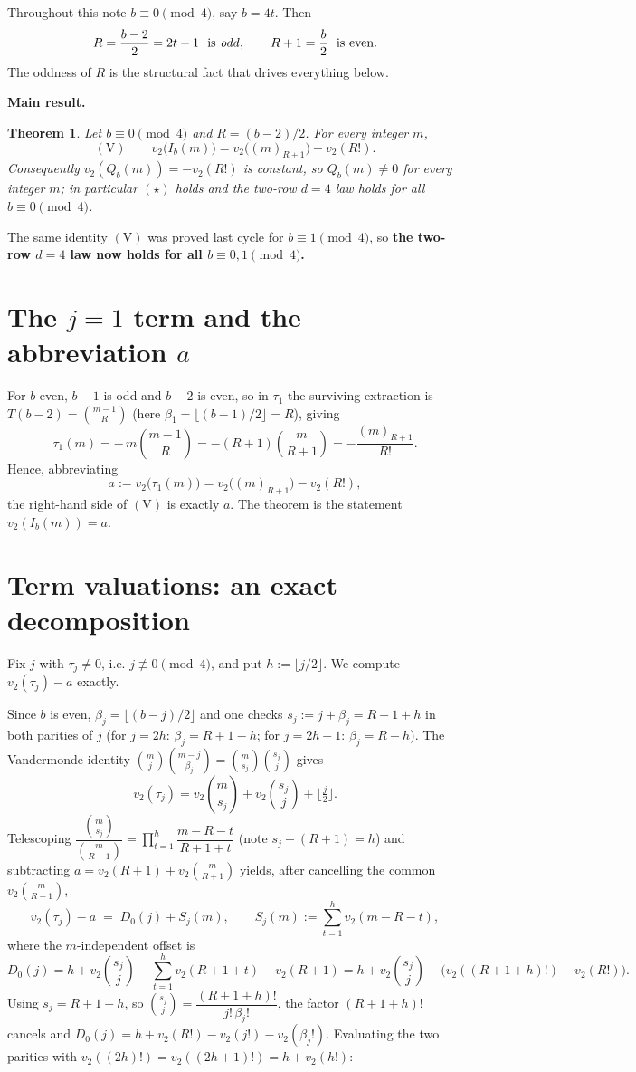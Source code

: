 \documentclass[11pt]{article}
\newtheorem{theorem}{Theorem}
\theoremstyle{definition}
\newcommand{\vtwo}{v_2}
\newcommand{\ff}[2]{(#1)_{#2}}
\begin{document}
Throughout this note $b\equiv 0\pmod 4$, say $b=4t$. Then
\[
   R=\frac{b-2}2=2t-1\ \text{ is \emph{odd}},\qquad R+1=\frac b2\ \text{ is even}.
\]
The oddness of $R$ is the structural fact that drives everything below.

\medskip
\noindent\textbf{Main result.}
\begin{theorem}\label{thm:main}
Let $b\equiv 0\pmod 4$ and $R=(b-2)/2$. For every integer $m$,
\[
   (\mathrm V)\qquad \vtwo\bigl(I_b(m)\bigr)=\vtwo\bigl(\ff{m}{R+1}\bigr)-\vtwo(R!).
\]
Consequently $\vtwo(Q_b(m))=-\vtwo(R!)$ is constant, so $Q_b(m)\neq 0$ for every
integer $m$; in particular $(\star)$ holds and the two-row $d=4$ law holds for all
$b\equiv 0\pmod 4$.
\end{theorem}

The same identity $(\mathrm V)$ was proved last cycle for $b\equiv 1\pmod 4$, so
\textbf{the two-row $d=4$ law now holds for all $b\equiv 0,1\pmod 4$.}

\section{The $j=1$ term and the abbreviation $a$}

For $b$ even, $b-1$ is odd and $b-2$ is even, so in $\tau_1$ the surviving
extraction is $T(b-2)=\binom{m-1}{R}$ (here $\beta_1=\lfloor(b-1)/2\rfloor=R$),
giving
\[
   \tau_1(m)=-\,m\binom{m-1}{R}=-(R+1)\binom{m}{R+1}=-\frac{\ff{m}{R+1}}{R!}.
\]
Hence, abbreviating
\[
   a:=\vtwo\bigl(\tau_1(m)\bigr)=\vtwo\bigl(\ff{m}{R+1}\bigr)-\vtwo(R!),
\]
the right-hand side of $(\mathrm V)$ is exactly $a$. The theorem is the statement
$\vtwo(I_b(m))=a$.

\section{Term valuations: an exact decomposition}\label{sec:decomp}

Fix $j$ with $\tau_j\neq 0$, i.e. $j\not\equiv 0\pmod 4$, and put
$h:=\lfloor j/2\rfloor$. We compute $\vtwo(\tau_j)-a$ exactly.

Since $b$ is even, $\beta_j=\lfloor (b-j)/2\rfloor$ and one checks
$s_j:=j+\beta_j=R+1+h$ in both parities of $j$ (for $j=2h$: $\beta_j=R+1-h$; for
$j=2h+1$: $\beta_j=R-h$). The Vandermonde identity
$\binom{m}{j}\binom{m-j}{\beta_j}=\binom{m}{s_j}\binom{s_j}{j}$ gives
\[
   \vtwo(\tau_j)=\vtwo\!\binom{m}{s_j}+\vtwo\!\binom{s_j}{j}+\Big\lfloor\tfrac j2\Big\rfloor .
\]
Telescoping $\dfrac{\binom{m}{s_j}}{\binom{m}{R+1}}
=\prod_{t=1}^{h}\dfrac{m-R-t}{R+1+t}$ (note $s_j-(R+1)=h$) and subtracting
$a=\vtwo(R+1)+\vtwo\binom{m}{R+1}$ yields, after cancelling the common
$\vtwo\binom{m}{R+1}$,
\[
   \boxed{\ \vtwo(\tau_j)-a \;=\; D_0(j)+S_j(m),\qquad
   S_j(m):=\sum_{t=1}^{h}\vtwo(m-R-t),\ }
\]
where the $m$-independent offset is
\[
   D_0(j)=h+\vtwo\!\binom{s_j}{j}-\sum_{t=1}^{h}\vtwo(R+1+t)-\vtwo(R+1)
        =h+\vtwo\!\binom{s_j}{j}-\bigl(\vtwo((R+1+h)!)-\vtwo(R!)\bigr).
\]
Using $s_j=R+1+h$, so $\binom{s_j}{j}=\dfrac{(R+1+h)!}{j!\,\beta_j!}$, the factor
$(R+1+h)!$ cancels and $D_0(j)=h+\vtwo(R!)-\vtwo(j!)-\vtwo(\beta_j!)$. Evaluating
the two parities with $\vtwo((2h)!)=\vtwo((2h+1)!)=h+\vtwo(h!)$:
\end{document}
